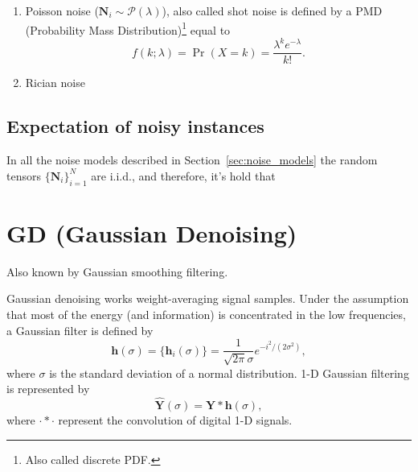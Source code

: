 \documentclass{article}
\begin{document}
\begin{enumerate}
\item Poisson noise ($\mathbf{N}_i\sim\mathcal{P}(\lambda)$), also called shot noise is defined by a PMD (Probability Mass Distribution)\footnote{Also
  called discrete PDF.} equal to
  \begin{equation}
    f(k; \lambda) = \Pr(X{=}k) = \frac{\lambda^k e^{-\lambda}}{k!}.
  \end{equation}
\item Rician noise
\end{enumerate}

\subsection{Expectation of noisy instances}
In all the noise models described in Section~\ref{sec:noise_models}
the random tensors $\{{\mathbf N}_i\}_{i=1}^N$ are i.i.d., and therefore,
it's hold that




\section{GD (Gaussian Denoising)}

Also known by Gaussian smoothing filtering.

Gaussian denoising works weight-averaging signal samples. Under the
assumption that most of the energy (and information) is concentrated
in the low frequencies, a Gaussian filter is defined by
\begin{equation}
  \mathbf{h}(\sigma) = \{\mathbf{h}_i(\sigma)\} = \frac{1}{\sqrt{2\pi}\sigma}e^{{-i}^2/(2\sigma^2)},
\end{equation}
where $\sigma$ is the standard deviation of a normal
distribution. 1-D Gaussian filtering is represented by
\begin{equation}
  \hat{\mathbf{Y}}(\sigma) = \mathbf{Y}*\mathbf{h}(\sigma),
  \label{eq:GF}
\end{equation}
where $\cdot*\cdot$ represent the convolution of digital 1-D signals.
\end{document}

